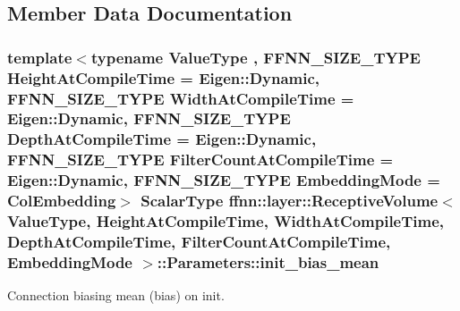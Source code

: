 \subsection{Member Data Documentation}
\hypertarget{structffnn_1_1layer_1_1_receptive_volume_1_1_parameters_aab8f9e3eb6e371d1046acb5735156095}{
\subsubsection[{init\-\_\-bias\-\_\-mean}]{\setlength{\rightskip}{0pt plus 5cm}template$<$typename Value\-Type , F\-F\-N\-N\-\_\-\-S\-I\-Z\-E\-\_\-\-T\-Y\-P\-E Height\-At\-Compile\-Time = Eigen\-::\-Dynamic, F\-F\-N\-N\-\_\-\-S\-I\-Z\-E\-\_\-\-T\-Y\-P\-E Width\-At\-Compile\-Time = Eigen\-::\-Dynamic, F\-F\-N\-N\-\_\-\-S\-I\-Z\-E\-\_\-\-T\-Y\-P\-E Depth\-At\-Compile\-Time = Eigen\-::\-Dynamic, F\-F\-N\-N\-\_\-\-S\-I\-Z\-E\-\_\-\-T\-Y\-P\-E Filter\-Count\-At\-Compile\-Time = Eigen\-::\-Dynamic, F\-F\-N\-N\-\_\-\-S\-I\-Z\-E\-\_\-\-T\-Y\-P\-E Embedding\-Mode = Col\-Embedding$>$ {\bf Scalar\-Type} {\bf ffnn\-::layer\-::\-Receptive\-Volume}$<$ Value\-Type, Height\-At\-Compile\-Time, Width\-At\-Compile\-Time, Depth\-At\-Compile\-Time, Filter\-Count\-At\-Compile\-Time, {\bf Embedding\-Mode} $>$\-::Parameters\-::init\-\_\-bias\-\_\-mean}}\label{structffnn_1_1layer_1_1_receptive_volume_1_1_parameters_aab8f9e3eb6e371d1046acb5735156095}


Connection biasing mean (bias) on init. 

